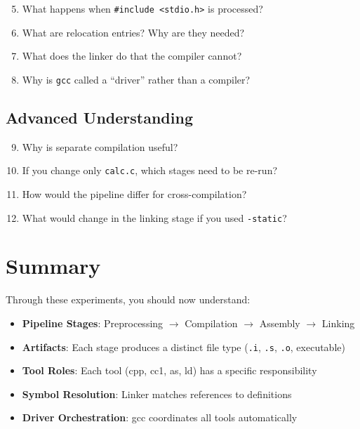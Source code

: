 \begin{enumerate}
\setcounter{enumi}{4}
\item What happens when \texttt{\#include <stdio.h>} is processed?
\item What are relocation entries? Why are they needed?
\item What does the linker do that the compiler cannot?
\item Why is \texttt{gcc} called a ``driver'' rather than a compiler?
\end{enumerate}

\subsection{Advanced Understanding}

\begin{enumerate}
\setcounter{enumi}{8}
\item Why is separate compilation useful?
\item If you change only \texttt{calc.c}, which stages need to be re-run?
\item How would the pipeline differ for cross-compilation?
\item What would change in the linking stage if you used \texttt{-static}?
\end{enumerate}

\section{Summary}

Through these experiments, you should now understand:

\begin{itemize}
\item \textbf{Pipeline Stages}: Preprocessing $\rightarrow$ Compilation $\rightarrow$ Assembly $\rightarrow$ Linking
\item \textbf{Artifacts}: Each stage produces a distinct file type (\texttt{.i}, \texttt{.s}, \texttt{.o}, executable)
\item \textbf{Tool Roles}: Each tool (cpp, cc1, as, ld) has a specific responsibility
\item \textbf{Symbol Resolution}: Linker matches references to definitions
\item \textbf{Driver Orchestration}: gcc coordinates all tools automatically
\end{itemize}
